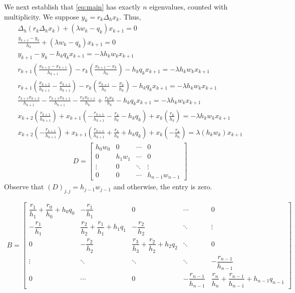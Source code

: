 \documentclass[12pt,reqno]{amsart}
\numberwithin{equation}{section}
\begin{document}
We next establish that \eqref{eq:main} has exactly $n$ eigenvalues, counted with multiplicity. We suppose $y_k=r_k\Delta_hx_k.$ Thus,
    \begin{gather*}
        \Delta_h\left(r_k\Delta_h x_k\right)+\left(\lambda w_k-q_k\right)x_{k+1}=0 \\
        \frac{y_{k+1}-y_{k}}{h_k}+\left(\lambda w_k-q_k\right)x_{k+1}=0 \\ 
        y_{k+1}-y_k-h_kq_kx_{k+1}=-\lambda h_k w_kx_{k+1} \\ 
        r_{k+1}\left(\frac{x_{k+2}-x_{k+1}}{h_{k+1}}\right)-r_k\left(\frac{x_{k+1}-x_k}{h_k}\right)-h_kq_kx_{k+1}=-\lambda h_kw_kx_{k+1} \\
        r_{k+1}\left(\frac{x_{k+2}}{h_{k+1}}-\frac{x_{k+1}}{h_{k+1}}\right)-r_k\left(\frac{x_{k+1}}{h_k}-\frac{x_{k}}{h_k}\right)-h_kq_kx_{k+1}=-\lambda h_kw_kx_{k+1} \\ 
        \frac{r_{k+1}x_{k+2}}{h_{k+1}}-\frac{r_{k+1}x_{k+1}}{h_{k+1}}-\frac{r_kx_{k+1}}{h_k}+\frac{r_kx_k}{h_k}-h_kq_kx_{k+1}=-\lambda h_kw_kx_{k+1} \\ x_{k+2}\left(\frac{r_{k+1}}{h_{k+1}}\right)+x_{k+1}\left(-\frac{r_{k+1}}{h_{k+1}}-\frac{r_k}{h_k}-h_kq_k\right)+x_k\left(\frac{r_k}{h_k}\right)=-\lambda h_kw_kx_{k+1} \\
        x_{k+2}\left(-\frac{r_{k+1}}{h_{k+1}}\right)+x_{k+1}\left(\frac{r_{k+1}}{h_{k+1}}+\frac{r_k}{h_k}+h_kq_k\right)+x_k\left(-\frac{r_k}{h_k}\right)=\lambda\left(h_kw_k\right)x_{k+1}
    \end{gather*}
    \begin{align*}D= \begin{bmatrix}
  {{h_0}{w_0}}&0& \cdots &0 \\ 
  0&{{h_1}{w_1}}& \cdots &0 \\ 
   \vdots &0& \ddots & \vdots  \\ 
  0&0& \cdots &{{h_{n - 1}}{w_{n - 1}}}
\end{bmatrix} \end{align*}
Observe that \(\left(D\right)_{j,j}=h_{j-1}w_{j-1}\) and otherwise, the entry is zero.

\begin{align*}
B=
\begin{bmatrix}
\dfrac{r_1}{h_1}+\dfrac{r_0}{h_0}+h_0 q_0 & -\dfrac{r_1}{h_1} & 0 & \cdots & 0 \\[1.4em]
-\dfrac{r_1}{h_1} & \dfrac{r_2}{h_2}+\dfrac{r_1}{h_1}+h_1 q_1 & -\dfrac{r_2}{h_2} & \ddots & \vdots \\[1.4em]
0 & -\dfrac{r_2}{h_2} & \dfrac{r_3}{h_3}+\dfrac{r_2}{h_2}+h_2 q_2 & \ddots & 0 \\[1.4em]
\vdots & \ddots & \ddots & \ddots & -\dfrac{r_{n-1}}{h_{n-1}} \\[1.4em]
0 & \cdots & 0 & -\dfrac{r_{n-1}}{h_{n-1}} &  \dfrac{r_n}{h_n}+\dfrac{r_{n-1}}{h_{n-1}}+h_{n-1} q_{n-1}
\end{bmatrix}
\end{align*}
\end{document}
